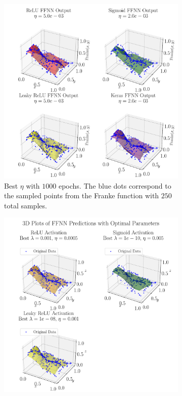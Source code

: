 \documentclass[%
reprint,s
amsmath,amssymb,
aps,
]{revtex4-2}
\begin{document}
\begin{figure}[ht!]
	\begin{subfigure}[b]{0.43\textwidth}
		\includegraphics[width=\textwidth]{Figures/NN_3D_Predict_Franke_Epochs1000.pdf}
		\caption{Best $\eta$ with $1000$ epochs. The blue dots correspond to the sampled points from the Franke function with $250$ total samples.}
		\label{fig:3D_Franke}
	\end{subfigure}
	\hfill
	\begin{subfigure}[b]{0.43\textwidth}
		\includegraphics[width=\textwidth]{Figures/NN_noKeras_3D_Franke_Epochs250.pdf}

\end{subfigure}
\end{figure}
\end{document}
